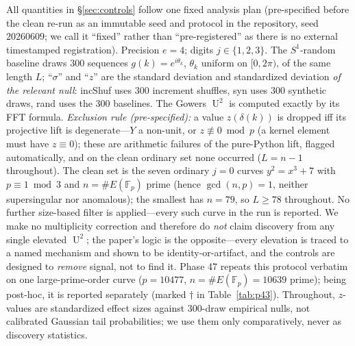 \documentclass[11pt]{article}
\theoremstyle{definition}
\newcommand{\Fp}{\mathbb{F}_p}
\DeclareMathOperator{\Uk}{U}
\begin{document}
All quantities in \S\ref{sec:controls} follow one fixed analysis plan
(pre-specified before the clean re-run as an immutable seed and protocol
in the repository, seed $20260609$; we call it ``fixed'' rather than
``pre-registered'' as there is no external timestamped registration).
Precision $e=4$; digits
$j\in\{1,2,3\}$. The $S^1$-random baseline draws $300$ sequences
$g(k)=e^{i\theta_k}$, $\theta_k$ uniform on $[0,2\pi)$, of the same length
$L$; ``$\sigma$'' and ``$z$'' are the standard deviation and standardized
deviation \emph{of the relevant null}: incShuf uses $300$ increment
shuffles, syn uses $300$ synthetic draws, rand uses the $300$ baselines.
The Gowers $\Uk^2$ is computed exactly by its FFT formula. \emph{Exclusion
rule (pre-specified):} a value $z(\delta(k))$ is dropped iff its
projective lift is degenerate---$Y$ a non-unit, or $z\not\equiv 0\bmod p$
(a kernel element must have $z\equiv 0$); these are arithmetic failures of
the pure-Python lift, flagged automatically, and on the clean ordinary set
none occurred ($L=n-1$ throughout). The clean set is the seven ordinary
$j{=}0$ curves $y^2=x^3+7$ with $p\equiv 1\bmod 3$ and $n=\#E(\Fp)$ prime
(hence $\gcd(n,p)=1$, neither supersingular nor anomalous); the smallest
has $n=79$, so $L\ge 78$ throughout. No further size-based filter is
applied---every such curve in the run is reported.
We make no multiplicity correction and therefore do \emph{not} claim
discovery from any single elevated $\Uk^2$; the paper's logic is the
opposite---every elevation is traced to a named mechanism and shown to be
identity-or-artifact, and the controls are designed to \emph{remove}
signal, not to find it. Phase 47 repeats this protocol verbatim on one
large-prime-order curve ($p=10477$, $n=\#E(\Fp)=10639$ prime); being
post-hoc, it is reported separately (marked $\dagger$ in
Table~\ref{tab:p43}). Throughout, $z$-values are standardized effect
sizes against $300$-draw empirical nulls, not calibrated Gaussian tail
probabilities; we use them only comparatively, never as discovery
statistics.
\end{document}
